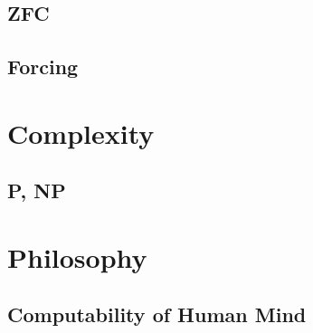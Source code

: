 \documentclass{article}
\begin{document}
  \subsection{ZFC}
    
  \subsection{Forcing}
    

\section{Complexity}
  \subsection{P, NP}
    
\section{Philosophy}
  \subsection{Computability of Human Mind}
    
\end{document}
